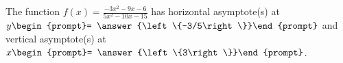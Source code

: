 \documentclass{ximera}
\author{Gregory Hartman \and Matthew Carr}
\begin{document}
\begin{exercise}





The function $f(x)=\frac{-3x^2-9x-6}{5x^2-10x-15}$ has horizontal asymptote(s) at $y\begin{prompt}= \answer{\left\{-3/5\right\}}\end{prompt}$ and vertical asymptote(s) at $x\begin{prompt}= \answer{\left\{3\right\}}\end{prompt}$.

\end{exercise}
\end{document}
